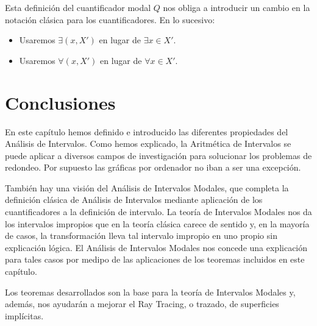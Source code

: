 Esta definición del cuantificador modal $Q$ nos obliga a introducir un cambio en la notación clásica para los cuantificadores. En lo sucesivo:

\begin{itemize}
\item Usaremos $\exists(x,X')$ en lugar de $\exists x \in X'$.
\item Usaremos $\forall(x,X')$ en lugar de $\forall x \in X'$.
\end{itemize}


\section{Conclusiones}

En este capítulo hemos definido e introducido las diferentes propiedades del Análisis de Intervalos. Como hemos explicado, la Aritmética de Intervalos se puede aplicar a diversos campos de investigación para solucionar los problemas de redondeo. Por supuesto las gráficas por ordenador no iban a ser una excepción.
\par También hay una visión del Análisis de Intervalos Modales, que completa la definición clásica de Análisis de Intervalos mediante aplicación de los cuantificadores a la definición de intervalo. La teoría de Intervalos Modales nos da los intervalos impropios que en la teoría clásica carece de sentido y, en la mayoría de casos, la transformación lleva tal intervalo impropio en uno propio sin explicación lógica. El Análisis de Intervalos Modales nos concede una explicación para tales casos por medipo de las aplicaciones de los teoremas incluidos en este capítulo.
\par Los teoremas desarrollados son la base para la teoría de Intervalos Modales y, además, nos ayudarán a mejorar el Ray Tracing, o trazado, de superficies implícitas.